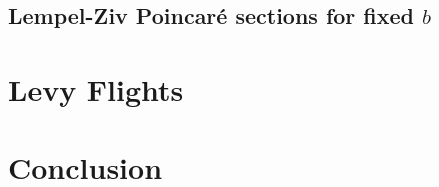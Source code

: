 \documentclass[notitlepage, a4paper]{article}
\theoremstyle{definition}
\begin{document}
\subsection{Lempel-Ziv Poincar\'e sections for fixed $b$}


\newpage

\section{Levy Flights}

\newpage

\section{Conclusion}


\newpage



\end{document}
